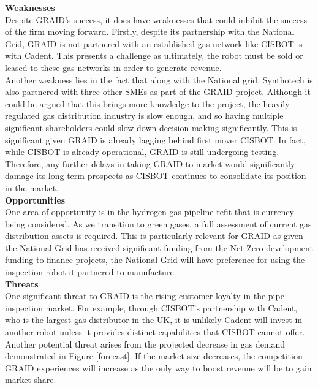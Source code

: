 \documentclass[11pt]{article}		%
\begin{document}
        \textbf{Weaknesses}\\
        Despite GRAID’s success, it does have weaknesses that could inhibit the success of the firm moving forward. Firstly, despite its partnership with the National Grid, GRAID is not partnered with an established gas network like CISBOT is with Cadent. This presents a challenge as ultimately, the robot must be sold or leased to these gas networks in order to generate revenue. \\
        \hspace*{3ex}Another weakness lies in the fact that along with the National grid, Synthotech is also partnered with three other SMEs as part of the GRAID project. Although it could be argued that this brings more knowledge to the project, the heavily regulated gas distribution industry is slow enough, and so having multiple significant shareholders could slow down decision making significantly. This is significant given GRAID is already lagging behind first mover CISBOT. In fact, while CISBOT is already operational, GRAID is still undergoing testing. Therefore, any further delays in taking GRAID to market would significantly damage its long term prospects as CISBOT continues to consolidate its position in the market. \\
        \textbf{Opportunities}\\
        One area of opportunity is in the hydrogen gas pipeline refit that is currency being considered. As we transition to green gases, a full assessment of current gas distribution assets is required. This is particularly relevant for GRAID as given the National Grid has received significant funding from the Net Zero development funding to finance projects, the National Grid will have preference for using the inspection robot it partnered to manufacture. \\
        \textbf{Threats} \\
        One significant threat to GRAID is the rising customer loyalty in the pipe inspection market. For example, through CISBOT's partnership with Cadent, who is the largest gas distributor in the UK, it is unlikely Cadent will invest in another robot unless it provides distinct capabilities that CISBOT cannot offer. Another potential threat arises from the projected decrease in gas demand demonstrated in \hyperref[forecast]{Figure \ref*{forecast}}. If the market size decreases, the competition GRAID experiences will increase as the only way to boost revenue will be to gain market share.
	
	\pagebreak		%
	
\end{document}
